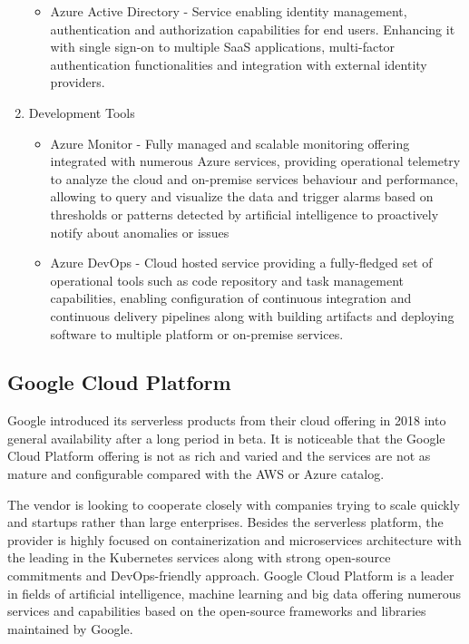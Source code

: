 \begin{enumerate}
   \begin{itemize}
       \item Azure Active Directory - Service enabling identity management, authentication and authorization capabilities for end users. Enhancing it with single sign-on to multiple SaaS applications, multi-factor authentication functionalities and integration with external identity providers.
   \end{itemize}
   \item Development Tools
   \begin{itemize}
       \item Azure Monitor - Fully managed and scalable monitoring offering integrated with numerous Azure services, providing operational telemetry to analyze the cloud and on-premise services behaviour and performance, allowing to query and visualize the data and trigger alarms based on thresholds or patterns detected by artificial intelligence to proactively notify about anomalies or issues
       \item Azure DevOps - Cloud hosted service providing a fully-fledged set of operational tools such as code repository and task management capabilities, enabling configuration of continuous integration and continuous delivery pipelines along with building artifacts and deploying software to multiple platform or on-premise services.
   \end{itemize}
\end{enumerate}

\subsection{Google Cloud Platform}

Google introduced its serverless products from their cloud offering in 2018 into general availability after a long period in beta. It is noticeable that the Google Cloud Platform offering is not as rich and varied and the services are not as mature and configurable compared with the AWS or Azure catalog.

The vendor is looking to cooperate closely with companies trying to scale quickly and startups rather than large enterprises. Besides the serverless platform, the provider is highly focused on containerization and microservices architecture with the leading in the Kubernetes services along with strong open-source commitments and DevOps-friendly approach. Google Cloud Platform is a leader in fields of artificial intelligence, machine learning and big data offering numerous services and capabilities based on the open-source frameworks and libraries maintained by Google.

